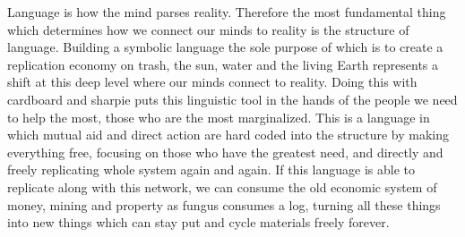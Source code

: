 Language is how the mind parses reality. Therefore the most fundamental
thing which determines how we connect our minds to reality is the
structure of language. Building a symbolic language the sole purpose of
which is to create a replication economy on trash, the sun, water and
the living Earth represents a shift at this deep level where our minds
connect to reality. Doing this with cardboard and sharpie puts this
linguistic tool in the hands of the people we need to help the most,
those who are the most marginalized. This is a language in which mutual
aid and direct action are hard coded into the structure by making
everything free, focusing on those who have the greatest need, and
directly and freely replicating whole system again and again. If this
language is able to replicate along with this network, we can consume
the old economic system of money, mining and property as fungus consumes
a log, turning all these things into new things which can stay put and
cycle materials freely forever.

